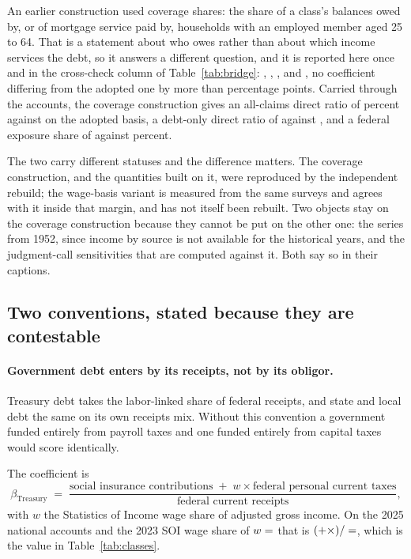 An earlier construction used coverage shares: the share of a class's balances owed by, or of
mortgage service paid by, households with an employed member aged 25 to 64. That is a statement
about who owes rather than about which income services the debt, so it answers a different
question, and it is reported here once and in the cross-check column of
Table~\ref{tab:bridge}: , ,
,  and , no
coefficient differing from the adopted one by more than  percentage
points. Carried through the accounts, the coverage construction gives an all-claims direct ratio
of  percent against  on the adopted basis,
a debt-only direct ratio of  against
, and a federal exposure share of
 against  percent.

The two carry different statuses and the difference matters. The coverage construction, and the
quantities built on it, were reproduced by the independent rebuild; the wage-basis variant is
measured from the same surveys and agrees with it inside that margin, and has not itself been
rebuilt. Two objects stay on the coverage construction because they cannot be put on the other
one: the series from 1952, since income by source is not available for the historical years, and
the judgment-call sensitivities that are computed against it. Both say so in their captions.

\subsection{Two conventions, stated because they are contestable}

\paragraph{Government debt enters by its receipts, not by its obligor.} Treasury debt takes the
labor-linked share of federal receipts, and state and local debt the same on its own receipts
mix. Without this convention a government funded entirely from payroll taxes and one funded
entirely from capital taxes would score identically.

The coefficient is
\[
\beta_{\text{Treasury}} \;=\;
\frac{\text{social insurance contributions} \;+\; w \times \text{federal personal current taxes}}
     {\text{federal current receipts}},
\]
with $w$ the Statistics of Income wage share of adjusted gross income. On the 2025 national
accounts and the 2023 SOI wage share of $w = \result{TBW}$ that is
$(\result{TBSocIns} + \result{TBW} \times \result{TBPersonal}) / \result{TBReceipts} =
\result{TBResult}$, which is the value in Table~\ref{tab:classes}.

